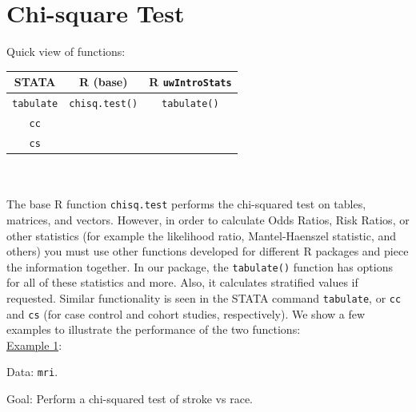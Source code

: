 \documentclass[11pt,letterpaper,fleqn]{report}
\begin{document}
\chapter{Chi-square Test}
Quick view of functions:\\
\begin{tabular}{ccc}
STATA & R (base) & R \texttt{uwIntroStats}\\
\hline
\texttt{tabulate} & \texttt{chisq.test()} & \texttt{tabulate()}\\
\texttt{cc} & & \\
\texttt{cs} & & \\
\end{tabular}\\
\\
The base R function \texttt{chisq.test} performs the chi-squared test on tables, matrices, and vectors. However, in order to calculate Odds Ratios, Risk Ratios, or other statistics (for example the likelihood ratio, Mantel-Haenszel statistic, and others) you must use other functions developed for different R packages and piece the information together. In our package, the \texttt{tabulate()} function has options for all of these statistics and more. Also, it calculates stratified values if requested. Similar functionality is seen in the STATA command \texttt{tabulate}, or \texttt{cc} and \texttt{cs} (for case control and cohort studies, respectively). We show a few examples to illustrate the performance of the two functions:
\\

\underline{Example 1}:

Data: \texttt{mri}.

Goal: Perform a chi-squared test of stroke vs race.
\end{document}
